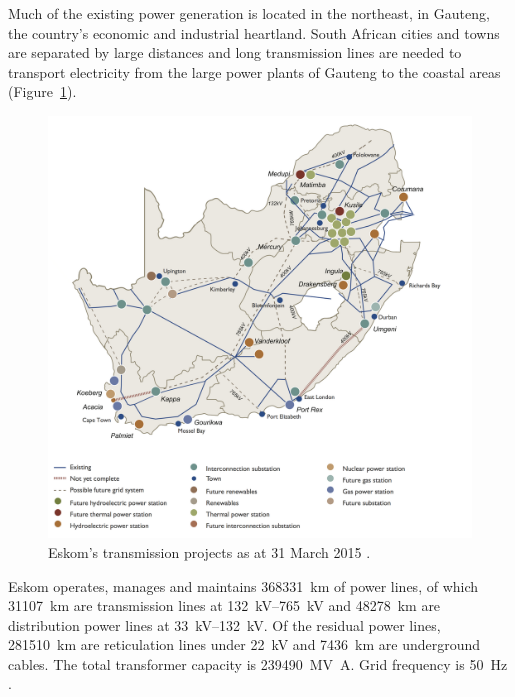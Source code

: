 Much of the existing power generation is located in the northeast, in Gauteng, the country's economic and industrial heartland. South African cities and towns are separated by large distances and long transmission lines are needed to transport electricity from the large power plants of Gauteng to the coastal areas (Figure~\ref{transmissionprojekts}). 

\begin{figure}[htbp]
\centering
\includegraphics[width=1\linewidth]{FIG/transmissionprojekts}
\caption[Eskom’s transmission projects as at 31 March 2015.]{Eskom’s transmission projects as at 31 March 2015 \cite{Eskom2015a}.}\label{transmissionprojekts}
\end{figure}
Eskom operates, manages and maintains \SI{368331}{\kilo\meter} of power lines, of which \SI{31107}{\kilo\meter} are transmission lines at \SIrange{132}{765}{\kilo\volt} and \SI{48278}{\kilo\meter} are distribution power lines at \SIrange{33}{132}{\kilo\volt}. Of the residual power lines, \SI{281510}{\kilo\meter} are reticulation lines under \SI{22}{\kilo\volt} and \SI{7436}{\kilo\meter} are underground cables. The total transformer capacity is \SI{239490}{\mega\volt\ampere}. Grid frequency is \SI{50}{\hertz} \cite{Eskom2015b}.

